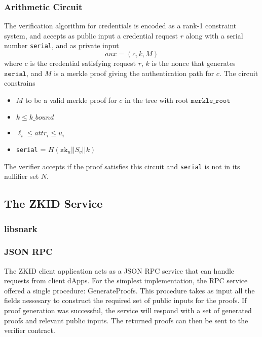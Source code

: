 \documentclass[11 pt]{extarticle}
\theoremstyle{remark}
\begin{document}
\subsubsection{Arithmetic Circuit}
The verification algorithm for credentials is encoded as a rank-1 constraint
system, and accepts as public input a credential request $r$ along with a serial
number \texttt{serial}, and as private
input
\begin{equation*}
  aux = (c, k, M)
\end{equation*}
where $c$ is the credential satisfying request $r$, $k$ is the nonce that
generates $\texttt{serial}$, and $M$ is a merkle proof giving the authentication
path for $c$. The circuit constrains
\begin{itemize}
\item $M$ to be a valid merkle proof for $c$ in
  the tree with root $\texttt{merkle\_root}$
\item $k \leq k\_bound$
  \item  $\ell_i\leq
    attr_i\leq u_i$
  \item \texttt{serial} = $ H(\texttt{sk}_u || S_v || k)$
\end{itemize}

The verifier accepts if the proof satisfies this circuit and \texttt{serial} is
not in its nullifier set $N$.


\subsection{The ZKID Service}

\subsubsection{libsnark}

\subsubsection{JSON RPC}

The ZKID client application acts as a JSON RPC service that can handle requests from client dApps. For the simplest implementation,
the RPC service offered a single procedure: GenerateProofs. This procedure takes as input all the fields nessesary
to construct the required set of public inputs for the proofs. If proof generation was successful, the service will respond with a 
set of generated proofs and relevant public inputs. The returned proofs can then be sent to the verifier contract.  
\end{document}
